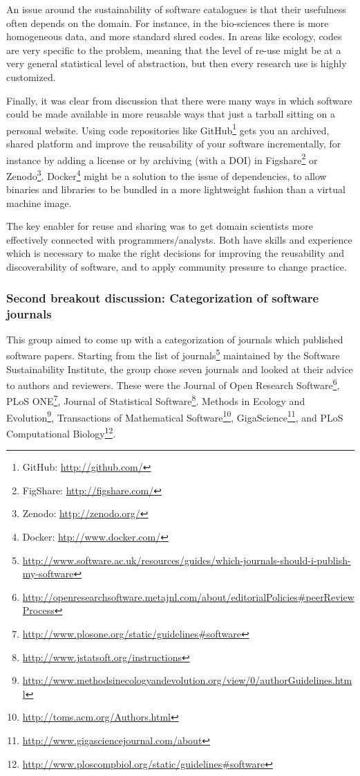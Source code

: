 \documentclass[11pt, oneside]{amsart}
\begin{document}
An issue around the sustainability of software catalogues is that their
usefulness often depends on the domain. For instance, in the bio-sciences there
is more homogeneous data, and more standard shred codes. In areas like ecology,
codes are very specific to the problem, meaning that the level of re-use might
be at a very general statistical level of abstraction, but then every research
use is highly customized.

Finally, it was clear from discussion that there were many ways in which
software could be made available in more reusable ways that just a tarball
sitting on a personal website. Using code repositories like
GitHub\footnote{GitHub: \url{http://github.com/}} gets you an archived, shared
platform and improve the reusability of your software incrementally, for
instance by adding a license or by archiving (with a DOI) in
Figshare\footnote{FigShare: \url{http://figshare.com/}} or
Zenodo\footnote{Zenodo: \url{http://zenodo.org/}}. Docker\footnote{Docker:
\url{htp://www.docker.com/}} might be a solution to the issue of dependencies,
to allow binaries and libraries to be bundled in a more lightweight fashion than
a virtual machine image.

The key enabler for reuse and sharing was to get domain scientists more
effectively connected with programmers/analysts. Both have skills and experience
which is necessary to make the right decisions for improving the reusability and
discoverability of software, and to apply community pressure to change practice.

\subsubsection{Second breakout discussion: Categorization of software journals}

This group aimed to come up with a categorization of journals which published
software papers. Starting from the list of
journals\footnote{\url{http://www.software.ac.uk/resources/guides/which-journals-should-i-publish-my-software}}
maintained by the Software Sustainability Institute, the group chose seven
journals and looked at their advice to authors and reviewers. These were the
Journal of Open Research
Software\footnote{\url{http://openresearchsoftware.metajnl.com/about/editorialPolicies\#peerReviewProcess}},
PLoS ONE\footnote{\url{http://www.plosone.org/static/guidelines\#software}},
Journal of Statistical
Software\footnote{\url{http://www.jstatsoft.org/instructions}}. Methods in
Ecology and
Evolution\footnote{\url{http://www.methodsinecologyandevolution.org/view/0/authorGuidelines.html}},
Transactions of Mathematical
Software\footnote{\url{http://toms.acm.org/Authors.html}},
GigaScience\footnote{\url{http://www.gigasciencejournal.com/about}}, and PLoS
Computational
Biology\footnote{\url{http://www.ploscompbiol.org/static/guidelines\#software}}.
\end{document}
